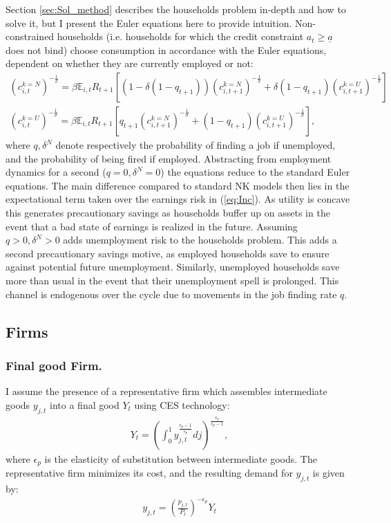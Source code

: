 Section \ref{sec:Sol_method} describes the households problem in-depth and how to solve it, but I present the Euler equations here to provide intuition. Non-constrained households (i.e. households for which the credit constraint $a_{t}\geq\underline{a}$ does not bind) choose consumption in accordance with the Euler equations, dependent on whether they are currently employed or not:
\begin{gather*}
\left(c_{i,t}^{k=N}\right)^{-\frac{1}{\sigma}}=\beta\mathbb{E}_{i,t}R_{t+1}\left[\left(1-\delta\left(1-q_{t+1}\right)\right)\left(c_{i,t+1}^{k=N}\right)^{-\frac{1}{\sigma}}+\delta\left(1-q_{t+1}\right)\left(c_{i,t+1}^{k=U}\right)^{-\frac{1}{\sigma}}\right] \\
\left(c_{i,t}^{k=U}\right)^{-\frac{1}{\sigma}}=\beta\mathbb{E}_{i,t}R_{t+1}\left[q_{t+1}\left(c_{i,t+1}^{k=N}\right)^{-\frac{1}{\sigma}}+(1-q_{t+1})\left(c_{i,t+1}^{k=U}\right)^{-\frac{1}{\sigma}}\right],
\end{gather*}
where $q,\delta^N$ denote respectively the probability of finding a job if unemployed, and the probability of being fired if employed. Abstracting from employment dynamics for a second ($q=0,\delta^N=0$) the equations reduce to the standard Euler equations. The main difference compared to standard NK models then lies in the expectational term taken over the earnings risk in (\ref{eq:Inc}). As utility is concave this generates precautionary savings as households buffer up on assets in the event that a bad state of earnings is realized in the future. Assuming $q>0,\delta^N>0$ adds unemployment risk to the households problem. This adds a second precautionary savings motive, as employed households save to ensure against potential future unemployment. Similarly, unemployed households save more than usual in the event that their unemployment spell is prolonged. This channel is endogenous over the cycle due to movements in the job finding rate $q$.  


\subsection{Firms}
\subsubsection*{Final good Firm.}
I assume the presence of a representative firm which assembles intermediate goods $y_{j,t}$ into a final good $Y_t$ using CES technology:
\begin{gather*}
Y_{t}=\left(\int_{0}^{1}y_{j,t}^{\frac{\epsilon_{p}-1}{\epsilon_{p}}}dj\right)^{\frac{\epsilon_{p}}{\epsilon_{p}-1}},
\end{gather*}
where $\epsilon_{p}$ is the elasticity of substitution between intermediate goods. The representative firm minimizes its cost, and the resulting demand for $y_{j,t}$ is given by:
\begin{gather}
y_{j,t}=\left(\frac{p_{j,t}}{P_{t}}\right)^{-\epsilon_{p}}Y_{t} \label{eq:Inter_goods_demand}
\end{gather}




